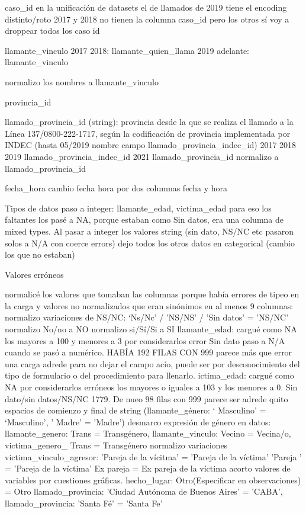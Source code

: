 \documentclass[10 pt]{article}
\begin{document}
caso\_id
en la unificación de datasets el de llamados de 2019 tiene el encoding distinto/roto
2017 y 2018 no tienen la columna caso\_id pero los otros sí
voy a droppear todos los caso id

llamante\_vinculo
2017 2018: llamante\_quien\_llama
2019 adelante: llamante\_vinculo

normalizo los nombres a llamante\_vinculo

provincia\_id

llamado\_provincia\_id (string): provincia desde la que se realiza el llamado a la Línea 137/0800-222-1717, según la codificación de provincia implementada por INDEC (hasta 05/2019 nombre campo llamado\_provincia\_indec\_id)
2017 2018 2019 llamado\_provincia_indec_id   2021 llamado\_provincia\_id
normalizo a llamado\_provincia\_id

fecha\_hora
cambio fecha hora por dos columnas fecha y hora

Tipos de datos
paso a integer: llamante\_edad, victima\_edad para eso los faltantes los pasé a NA, porque estaban como Sin datos, era una columna de mixed types. Al pasar a integer los valores string (sin dato, NS/NC etc pasaron solos a N/A con coerce errors)
dejo todos los otros datos en categorical (cambio los que no estaban)

Valores erróneos

normalicé los valores que tomaban las columnas porque había errores de tipeo en la carga y valores no normalizados que eran sinónimos en al menos 9 columnas:
normalizo variaciones de NS/NC:  ‘Ns/Nc’ / 'NS/NS' / 'Sin datos' = 'NS/NC'
normalizo No/no a NO
normalizo si/Sí/Si a SI
llamante_edad: cargué como NA los mayores a 100 y menores a 3 por considerarlos error Sin dato paso a N/A cuando se pasó a numérico. HABÍA 192 FILAS CON 999 parece más que error una carga adrede para no dejar el campo acío, puede ser por desconocimiento del tipo de formulario o del procedimiento para llenarlo.
ictima_edad: cargué como NA por considerarlos erróneos los mayores o iguales a 103 y los menores a 0. Sin dato/sin datos/NS/NC 1779. De nueo 98 filas con 999 parece ser adrede
quito espacios de comienzo y final de string (llamante\_género: ‘ Masculino’ = ‘Masculino’, ' Madre' = 'Madre')
desmarco expresión de género en datos: llamante\_genero: Trans = Transgénero, llamante_vinculo: Vecino = Vecina/o, victima\_genero_ Trans = Transgénero
normalizo variaciones victima\_vinculo\_agresor: 'Pareja de la vícitma' = 'Pareja de la víctima' 'Pareja ' = 'Pareja de la víctima' Ex pareja = Ex pareja de la víctima
acorto valores de variables por cuestiones gráficas. hecho\_lugar: Otro(Especificar en observaciones) = Otro
llamado\_provincia: 'Ciudad Autónoma de Buenos Aires' = 'CABA', llamado\_provincia: 'Santa Fé' = 'Santa Fe'
\end{document}
